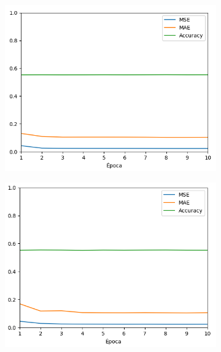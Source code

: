 \documentclass[conference]{IEEEtran}
\begin{document}
\begin{figure}[h]
\begin{subfigure}{0.24\textwidth}
		\includegraphics[width=\textwidth]{img/chauffeur3}
		\label{subfig:3}
	\end{subfigure}
	\begin{subfigure}{0.24\textwidth} 
		\includegraphics[width=\textwidth]{img/chauffeur5}
		\label{subfig:4}
	\end{subfigure}
	\begin{subfigure}{0.24\textwidth} 

\end{subfigure}
\end{figure}
\end{document}
